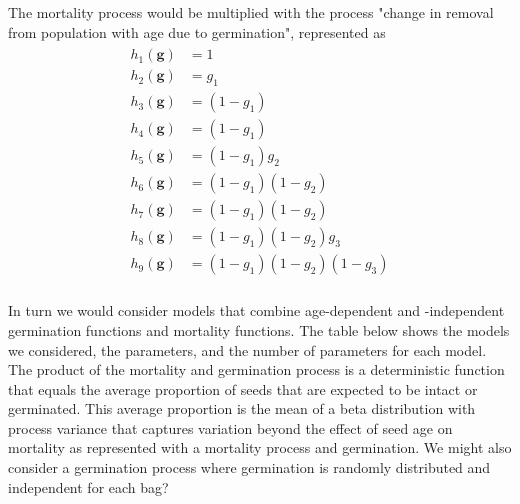 \documentclass[12pt, oneside, titlepage]{article}   	%
\begin{document}
The mortality process would be multiplied with the process "change in removal from population with age due to germination", represented as
%
\begin{align}
  \begin{split}
h_1(\bm{g}) & = 1 \\
h_2(\bm{g}) & = g_1 \\
h_3(\bm{g}) & = (1-g_1) \\
h_4(\bm{g}) & = (1-g_1) \\
h_5(\bm{g}) & = (1-g_1) g_2 \\
h_6(\bm{g}) & = (1-g_1) (1- g_2) \\
h_7(\bm{g}) & = (1-g_1) (1- g_2) \\
h_8(\bm{g}) & = (1-g_1) (1- g_2) g_3 \\
h_9(\bm{g}) & = (1-g_1) (1- g_2) (1-g_3) \\
  \end{split}
\end{align}
% 

In turn we would consider models that combine age-dependent and -independent germination functions and mortality functions. The table below shows the models we considered, the parameters, and the number of parameters for each model. The product of the mortality and germination process is a deterministic function that equals the average proportion of seeds that are expected to be intact or germinated. This average proportion is the mean of a beta distribution with process variance that captures variation beyond the effect of seed age on mortality as represented with a mortality process and germination.  We might also consider a germination process where germination is randomly distributed and independent for each bag?

\singlespace
\end{document}
